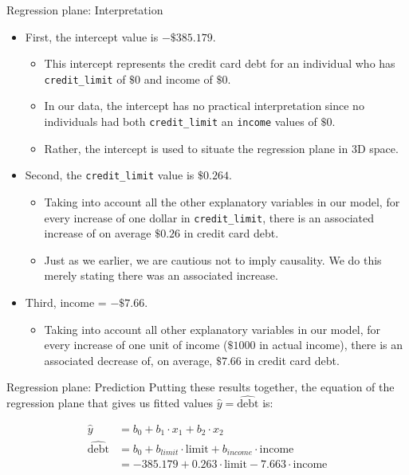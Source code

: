 \documentclass[
  ignorenonframetext,
]{beamer}
\providecommand{\tightlist}{%
  \setlength{\itemsep}{0pt}\setlength{\parskip}{0pt}}
\begin{document}
\begin{frame}[fragile]{Regression plane: Interpretation}
\label{regression-plane-interpretation}
\begin{itemize}
\item
  First, the intercept value is \(-\$385.179\).

  \begin{itemize}
  \tightlist
  \item
    This intercept represents the credit card debt for an individual who
    has \texttt{credit\_limit} of \(\$0\) and income of \(\$0\).
  \item
    In our data, the intercept has no practical interpretation since no
    individuals had both \texttt{credit\_limit} an \texttt{income}
    values of \(\$0\).
  \item
    Rather, the intercept is used to situate the regression plane in 3D
    space.
  \end{itemize}
\item
  Second, the \texttt{credit\_limit} value is \(\$0.264\).

  \begin{itemize}
  \tightlist
  \item
    Taking into account all the other explanatory variables in our
    model, for every increase of one dollar in \texttt{credit\_limit},
    there is an associated increase of on average \(\$0.26\) in credit
    card debt.
  \item
    Just as we earlier, we are cautious not to imply causality. We do
    this merely stating there was an associated increase.
  \end{itemize}
\item
  Third, income = \(-\$7.66\).

  \begin{itemize}
  \tightlist
  \item
    Taking into account all other explanatory variables in our model,
    for every increase of one unit of income (\(\$1000\) in actual
    income), there is an associated decrease of, on average, \(\$7.66\)
    in credit card debt.
  \end{itemize}
\end{itemize}
\end{frame}

\begin{frame}{Regression plane: Prediction}
\label{regression-plane-prediction}
Putting these results together, the equation of the regression plane
that gives us fitted values \(\hat{y}=\widehat{\text{debt}}\) is:

\[\begin{array}{ll}
\hat{y}&=b_0+b_1\cdot x_1+b_2\cdot x_2\\
\widehat{\text{debt}}&=b_0+b_{limit}\cdot \text{limit}+b_{income}\cdot \text{income}\\
&=-385.179+0.263 \cdot \text{limit}- 7.663\cdot \text{income}
\end{array}\]
\end{frame}
\end{document}
